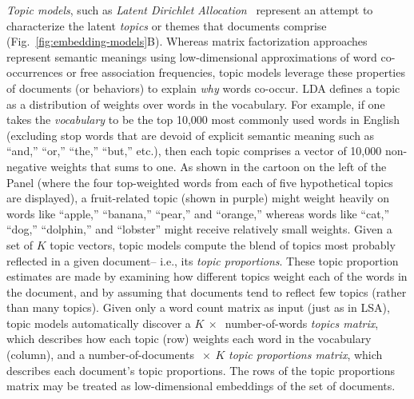 \documentclass{article}
\begin{document}
\textit{Topic models}, such as \textit{Latent Dirichlet Allocation}~\citep[LDA;][]{BleiEtal03} represent an attempt to characterize the latent \textit{topics} or themes that documents comprise (Fig.~\ref{fig:embedding-models}B).  Whereas matrix factorization approaches represent semantic meanings using low-dimensional approximations of word co-occurrences or free association frequencies, topic models leverage these properties of documents (or behaviors) to explain \textit{why} words co-occur.  LDA defines a topic as a distribution of weights over words in the vocabulary.  For example, if one takes the \textit{vocabulary} to be the top 10,000 most commonly used words in English (excluding stop words that are devoid of explicit semantic meaning such as ``and,'' ``or,'' ``the,'' ``but,'' etc.), then each topic comprises a vector of 10,000 non-negative weights that sums to one.  As shown in the cartoon on the left of the Panel (where the four top-weighted words from each of five hypothetical topics are displayed), a fruit-related topic (shown in purple) might weight heavily on words like ``apple,'' ``banana,'' ``pear,'' and ``orange,'' whereas words like ``cat,'' ``dog,'' ``dolphin,'' and ``lobster'' might receive relatively small weights.  Given a set of $K$ topic vectors, topic models compute the blend of topics most probably reflected in a given document-- i.e., its \textit{topic proportions}.  These topic proportion estimates are made by examining how different topics weight each of the words in the document, and by assuming that documents tend to reflect few topics (rather than many topics).  Given only a word count matrix as input (just as in LSA), topic models automatically discover a $K~\times~$ number-of-words \textit{topics matrix}, which describes how each topic (row) weights each word in the vocabulary (column), and a number-of-documents $~\times~K$ \textit{topic proportions matrix}, which describes each document's topic proportions.  The rows of the topic proportions matrix may be treated as low-dimensional embeddings of the set of documents.
\end{document}
